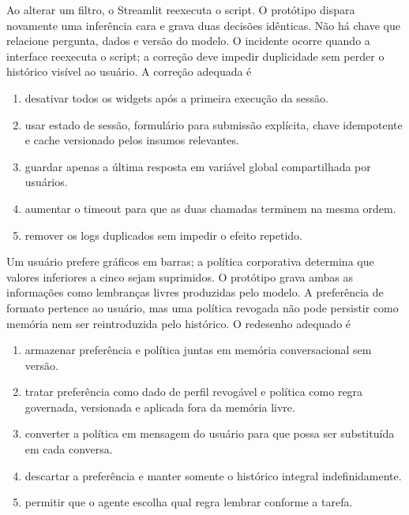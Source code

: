 \documentclass[12pt,a4paper]{article}
\begin{document}
\TextoBase
Ao alterar um filtro, o Streamlit reexecuta o script. O protótipo dispara novamente uma inferência cara e grava duas decisões idênticas. Não há chave que relacione pergunta, dados e versão do modelo.
O incidente ocorre quando a interface reexecuta o script; a correção deve impedir duplicidade sem perder o histórico visível ao usuário.
\FonteDidatica
\Comando A correção adequada é
\begin{enumerate}[label=\Alph*)]
  \item desativar todos os widgets após a primeira execução da sessão.
  \item usar estado de sessão, formulário para submissão explícita, chave idempotente e cache versionado pelos insumos relevantes.
  \item guardar apenas a última resposta em variável global compartilhada por usuários.
  \item aumentar o timeout para que as duas chamadas terminem na mesma ordem.
  \item remover os logs duplicados sem impedir o efeito repetido.
\end{enumerate}

\TextoBase
Um usuário prefere gráficos em barras; a política corporativa determina que valores inferiores a cinco sejam suprimidos. O protótipo grava ambas as informações como lembranças livres produzidas pelo modelo.
A preferência de formato pertence ao usuário, mas uma política revogada não pode persistir como memória nem ser reintroduzida pelo histórico.
\FonteDidatica
\Comando O redesenho adequado é
\begin{enumerate}[label=\Alph*)]
  \item armazenar preferência e política juntas em memória conversacional sem versão.
  \item tratar preferência como dado de perfil revogável e política como regra governada, versionada e aplicada fora da memória livre.
  \item converter a política em mensagem do usuário para que possa ser substituída em cada conversa.
  \item descartar a preferência e manter somente o histórico integral indefinidamente.
  \item permitir que o agente escolha qual regra lembrar conforme a tarefa.
\end{enumerate}
\end{document}
